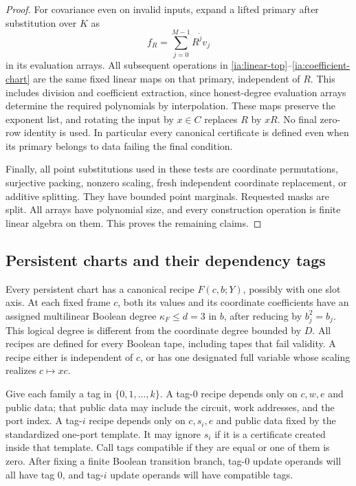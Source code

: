 \begin{proof}
For covariance even on invalid inputs, expand a lifted primary after
substitution over $K$ as
\[
 f_R=\sum_{j=0}^{M-1}R^{\widetilde j}v_j
\]
in its evaluation arrays.  All subsequent operations in
\eqref{ia:linear-top}--\eqref{ia:coefficient-chart} are the same fixed
linear maps on that primary, independent of $R$.  This includes
division and coefficient extraction, since honest-degree evaluation
arrays determine the required polynomials by interpolation.  These
maps preserve the exponent list, and rotating the input by $x\in C$
replaces $R$ by $xR$.  No final zero-row identity is used.  In particular
every canonical certificate is defined even when its primary belongs
to data failing the final condition.

Finally, all point substitutions used in these tests are coordinate
permutations, surjective packing, nonzero scaling, fresh independent
coordinate replacement, or additive splitting.  They have bounded
point marginals.  Requested masks are split.  All arrays have
polynomial size, and every construction operation is finite linear
algebra on them.  This proves the remaining claims.
\end{proof}
\subsection{Persistent charts and their dependency tags}
\label{ia:persistent}

Every persistent chart has a canonical recipe $F(c,b;Y)$, possibly
with one slot axis.  At each fixed frame $c$, both its values and its
coordinate coefficients have an assigned multilinear Boolean degree
$\kappa_F\le d=3$ in $b$, after reducing by $b_j^2=b_j$.  This
logical degree is different from the coordinate degree bounded by
$D$.  All recipes are defined for every Boolean tape, including tapes
that fail validity.  A recipe either is independent of $c$, or has
one designated full variable whose scaling realizes $c\mapsto xc$.

Give each family a tag in $\{0,1,\ldots,k\}$.  A tag-$0$ recipe
depends only on $c,w,e$ and public data; that public data may include
the circuit, work addresses, and the port index.  A tag-$i$ recipe
depends only on $c,s_i,e$ and public data fixed by the standardized
one-port template.  It may ignore $s_i$ if it is a certificate created
inside that template.  Call tags compatible if they are equal or one
of them is zero.  After fixing a finite Boolean transition branch,
tag-$0$ update operands will all have tag $0$, and tag-$i$ update
operands will have compatible tags.

